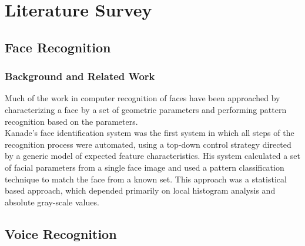 
\chapter{Literature Survey}

\section{Face Recognition}

\subsection{Background and Related Work}
Much of the work in computer recognition of faces have been approached by
characterizing a face by a set of geometric parameters and performing pattern
recognition based on the parameters. \\
Kanade's face identification system \cite{Kanade1973} was the first system in which all
steps of the recognition process were automated, using a top-down control strategy
directed by a generic model of expected feature characteristics. His system calculated
a set of facial parameters from a single face image and used a pattern classification
technique to match the face from a known set. This approach was a statistical
based approach, which depended primarily on local histogram analysis and absolute
gray-scale values. \\

\section{Voice Recognition}

